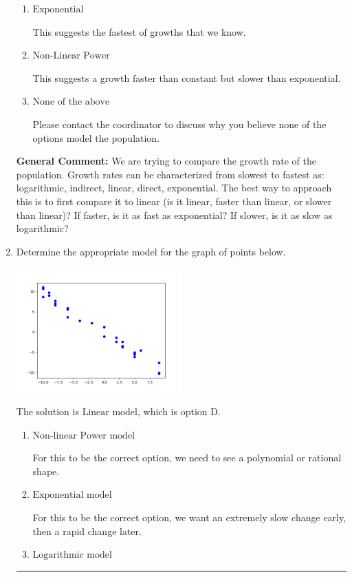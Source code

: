 \documentclass{extbook}[14pt]
\newcommand{\litem}[1]{\item #1

\rule{\textwidth}{0.4pt}}
\begin{document}
\begin{enumerate}
{\begin{enumerate}[label=\Alph*.]
This suggests the slowest of growths that we know.
\item \( \text{Exponential} \)

This suggests the fastest of growths that we know.
\item \( \text{Non-Linear Power} \)

This suggests a growth faster than constant but slower than exponential.
\item \( \text{None of the above} \)

Please contact the coordinator to discuss why you believe none of the options model the population.
\end{enumerate}

\textbf{General Comment:} We are trying to compare the growth rate of the population. Growth rates can be characterized from slowest to fastest as: logarithmic, indirect, linear, direct, exponential. The best way to approach this is to first compare it to linear (is it linear, faster than linear, or slower than linear)? If faster, is it as fast as exponential? If slower, is it as slow as logarithmic?
}
\litem{
Determine the appropriate model for the graph of points below.

\begin{center}
    \includegraphics[width=0.5\textwidth]{../Figures/identifyModelGraph11B.png}
\end{center}




The solution is \( \text{Linear model} \), which is option D.\begin{enumerate}[label=\Alph*.]
\item \( \text{Non-linear Power model} \)

For this to be the correct option, we need to see a polynomial or rational shape.
\item \( \text{Exponential model} \)

For this to be the correct option, we want an extremely slow change early, then a rapid change later.
\item \( \text{Logarithmic model} \)


\end{enumerate}}
\end{enumerate}
\end{document}
